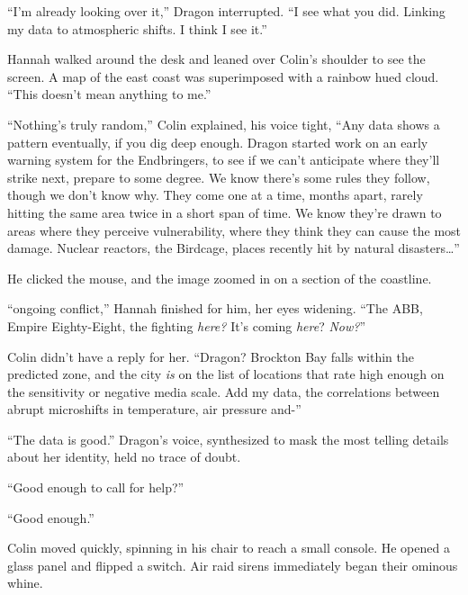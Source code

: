``I'm already looking over it,'' Dragon interrupted.  ``I see what you did.  Linking my data to atmospheric shifts.  I think I see it.''



Hannah walked around the desk and leaned over Colin's shoulder to see the screen.  A map of the east coast was superimposed with a rainbow hued cloud.  ``This doesn't mean anything to me.''



``Nothing's truly random,'' Colin explained, his voice tight, ``Any data shows a pattern eventually, if you dig deep enough.  Dragon started work on an early warning system for the Endbringers, to see if we can't anticipate where they'll strike next, prepare to some degree.  We know there's some rules they follow, though we don't know why.  They come one at a time, months apart, rarely hitting the same area twice in a short span of time.  We know they're drawn to areas where they perceive vulnerability, where they think they can cause the most damage.  Nuclear reactors, the Birdcage, places recently hit by natural disasters\ldots''



He clicked the mouse, and the image zoomed in on a section of the coastline.



``\ldotsOr ongoing conflict,'' Hannah finished for him, her eyes widening.  ``The ABB, Empire Eighty-Eight, the fighting \emph{here?}\emph{  }It's coming \emph{here}?  \emph{Now?}''



Colin didn't have a reply for her.  ``Dragon?  Brockton Bay falls within the predicted zone, and the city \emph{is} on the list of locations that rate high enough on the sensitivity or negative media scale.  Add my data, the correlations between abrupt microshifts in temperature, air pressure and-''



``The data is good.'' Dragon's voice, synthesized to mask the most telling details about her identity, held no trace of doubt.



``Good enough to call for help?''



``Good enough.''



Colin moved quickly, spinning in his chair to reach a small console.  He opened a glass panel and flipped a switch.  Air raid sirens immediately began their ominous whine.



